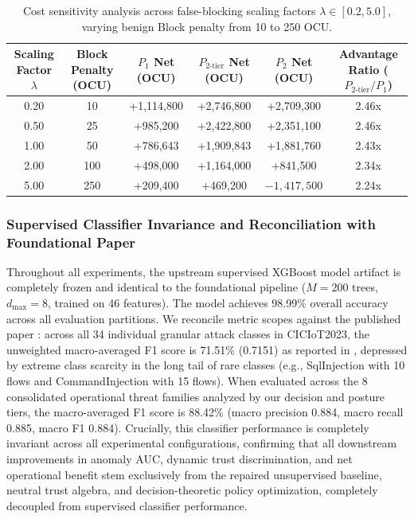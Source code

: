 \documentclass[journal,10pt,onecolumn]{IEEEtran}
\begin{document}
\begin{table}[t]
\caption{Cost sensitivity analysis across false-blocking scaling factors $\lambda \in [0.2, 5.0]$, varying benign Block penalty from 10 to 250 OCU.}
\label{tab:cost_sensitivity}
\centering
\small
\begin{tabular}{cccccc}
\toprule
\textbf{Scaling Factor $\lambda$} & \textbf{Block Penalty (OCU)} & \textbf{$P_1$ Net (OCU)} & \textbf{$P_{2\text{-tier}}$ Net (OCU)} & \textbf{$P_2$ Net (OCU)} & \textbf{Advantage Ratio ($P_{2\text{-tier}} / P_1$)} \\
\midrule
0.20 & 10 & +1,114,800 & +2,746,800 & +2,709,300 & 2.46x \\
0.50 & 25 & +985,200 & +2,422,800 & +2,351,100 & 2.46x \\
1.00 & 50 & +786,643 & +1,909,843 & +1,881,760 & 2.43x \\
2.00 & 100 & +498,000 & +1,164,000 & +841,500 & 2.34x \\
5.00 & 250 & +209,400 & +469,200 & $-1,417,500$ & 2.24x \\
\bottomrule
\end{tabular}
\end{table}

\subsubsection{Supervised Classifier Invariance and Reconciliation with Foundational Paper}
Throughout all experiments, the upstream supervised XGBoost model artifact is completely frozen and identical to the foundational pipeline \cite{1} ($M=200$ trees, $d_{\max}=8$, trained on 46 features). The model achieves 98.99\% overall accuracy across all evaluation partitions. We reconcile metric scopes against the published paper \cite{1}: across all 34 individual granular attack classes in CICIoT2023, the unweighted macro-averaged F1 score is 71.51\% (0.7151) as reported in \cite{1}, depressed by extreme class scarcity in the long tail of rare classes (e.g., SqlInjection with 10 flows and CommandInjection with 15 flows). When evaluated across the 8 consolidated operational threat families analyzed by our decision and posture tiers, the macro-averaged F1 score is 88.42\% (macro precision 0.884, macro recall 0.885, macro F1 0.884). Crucially, this classifier performance is completely invariant across all experimental configurations, confirming that all downstream improvements in anomaly AUC, dynamic trust discrimination, and net operational benefit stem exclusively from the repaired unsupervised baseline, neutral trust algebra, and decision-theoretic policy optimization, completely decoupled from supervised classifier performance.
\end{document}
